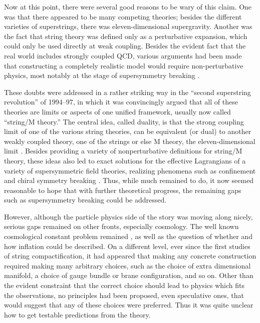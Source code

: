 \documentclass[aps,amsfonts]{ar2e}
\begin{document}
Now at this point, there were several good reasons to be wary of
this claim.  One was that there appeared to be many competing
theories; besides the different varieties of superstrings, there was
eleven-dimensional supergravity.  Another was the fact that string
theory was defined only as a perturbative expansion, which could
only be used directly at weak coupling.  Besides the evident fact
that the real world includes strongly coupled QCD, various arguments
had been made that constructing a completely realistic model would require
non-perturbative physics, most notably at the stage of supersymmetry
breaking
\cite{Dine:1985he}.

These doubts were addressed in a rather striking way in the ``second
superstring revolution'' of 1994--97, in which it was convincingly
argued that all of these theories are limits or aspects of one
unified framework, usually now called ``string/M theory.''  The
central idea, called duality, is that the strong coupling limit of
one of the various string theories, can be equivalent (or dual) to
another weakly coupled theory, one of the strings or else M theory,
the eleven-dimensional limit
\cite{Sen:2001di}.
Besides providing a variety of
nonperturbative definitions for string/M theory, these ideas also
led to exact solutions for the effective Lagrangians of a variety of
supersymmetric field theories, realizing phenomena such as
confinement and chiral symmetry breaking
\cite{Intriligator:1995au}.
Thus, while much remained
to do, it now seemed reasonable to hope that with further
theoretical progress, the remaining gaps such as supersymmetry
breaking could be addressed.

However, although the particle physics side of the story was moving
along nicely, serious gaps remained on other fronts, especially
cosmology.  The well known cosmological constant problem remained
\cite{Weinberg:1988cp,Weinberg:2000yb},
as well as the question of whether and how inflation could be
described. On a different level, ever since the first studies of
string compactification, it had appeared that making any concrete
construction required making many arbitrary choices, such as the
choice of extra dimensional manifold, a choice of gauge bundle or
brane configuration, and so on.  Other than the evident constraint
that the correct choice should lead to physics which fits the
observations, no principles had been proposed, even speculative
ones, that would suggest that any of these choices were preferred.
Thus it was quite unclear how to get testable predictions from the
theory.
\end{document}
